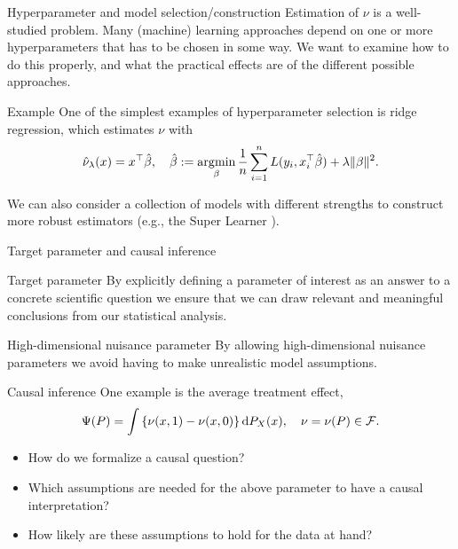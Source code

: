 \documentclass[smaller]{beamer}\usepackage{listings}
\begin{document}
\begin{frame}[label={sec:orgbdaffad}]{Hyperparameter and model selection/construction}
Estimation of \(\nu\) is a well-studied problem. Many (machine) learning approaches depend on one or
more hyperparameters that has to be chosen in some way. We want to examine how to do this properly,
and what the practical effects are of the different possible approaches.

\vfill

\begin{block}{Example}
One of the simplest examples of hyperparameter selection is ridge regression, which estimates \(\nu\)
with
\begin{equation*}
  \hat{\nu}_{\lambda}(x) = x^{\top} \hat{\beta}, \quad
  \hat{\beta} := \operatorname*{\arg\!\min}_{\beta} \frac{1}{n} \sum_{i=1}^{n}L(y_i, x_i^{\top} \hat{\beta}) + \lambda
  \Vert \beta \Vert^2.
\end{equation*}

We can also consider a collection of models with different strengths to construct more robust
estimators (e.g., the Super Learner \cite{HoffmanBlog,van2011targeted}).
\end{block}
\end{frame}

\begin{frame}[label={sec:orgfa65db6}]{Target parameter and causal inference}
\begin{block}{Target parameter}
By explicitly defining a parameter of interest as an answer to a concrete scientific question we
ensure that we can draw relevant and meaningful conclusions from our statistical analysis.
\end{block}

\begin{block}{High-dimensional nuisance parameter}
By allowing high-dimensional nuisance parameters we avoid having to make unrealistic model
assumptions.
\end{block}

\begin{block}{Causal inference}
One example is the average treatment effect, \[\Psi(P) = \int {\left\{ \nu(x, 1) - \nu(x, 0)
\right\}} \mathop{}\!\mathrm{d} P_X(x), \quad \nu=\nu(P) \in \mathcal{F}. \]

\begin{itemize}
\item How do we formalize a causal question?
\item Which assumptions are needed for the above parameter to have a causal interpretation?
\item How likely are these assumptions to hold for the data at hand?
\end{itemize}
\end{block}
\end{frame}
\end{document}
